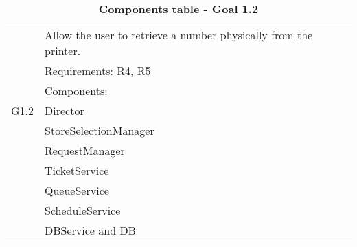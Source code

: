 \begin{table}
\begin{flushleft}
\begin{tabular}{|l|l|}
\hline
\cellcolor[HTML]{EC8D78}& \cellcolor[HTML]{F4D5CE}Allow the user to retrieve a number physically from the printer.\\
\cline{2-2}
\cellcolor[HTML]{EC8D78}& \cellcolor[HTML]{F4D5CE}Requirements: R4, R5 \\
\cline{2-2}
\cellcolor[HTML]{EC8D78}&Components:\\

\cellcolor[HTML]{EC8D78}G1.2&\quad\quad	Director \\

\cellcolor[HTML]{EC8D78}&\quad\quad	StoreSelectionManager \\

\cellcolor[HTML]{EC8D78}&\quad\quad	RequestManager \\

\cellcolor[HTML]{EC8D78}&\quad\quad\quad\quad	TicketService \\

\cellcolor[HTML]{EC8D78}&\quad\quad\quad\quad	QueueService \\

\cellcolor[HTML]{EC8D78}&\quad\quad\quad\quad	ScheduleService\\ 

\cellcolor[HTML]{EC8D78}&\quad\quad	DBService and DB \\
\hline
\end{tabular}
\end{flushleft}
\caption{\textbf{Components table - Goal 1.2}}
\label{tab:comp1}
\end{table}

